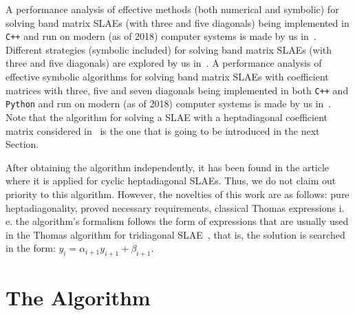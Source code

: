 \documentclass[11pt, a4paper]{article}
\begin{document}
A performance analysis of effective methods (both numerical and symbolic) for
solving band matrix SLAEs (with three and five diagonals) being implemented in
\texttt{C++} and run on modern (as of 2018) computer systems is made by us
in~\cite{Veneva_2019}. Different strategies (symbolic included) for solving
band matrix SLAEs (with three and five diagonals) are explored by us
in~\cite{Veneva_2018}. A performance analysis of effective symbolic algorithms
for solving band matrix SLAEs with coefficient matrices with three, five and
seven diagonals being implemented in both \texttt{C++} and \texttt{Python} and
run on modern (as of 2018) computer systems is made by us in~\cite{Veneva}.
Note that the algorithm for solving a SLAE with a heptadiagonal coefficient
matrix considered in~\cite{Veneva} is the one that is going to be introduced
in the next Section.

After obtaining the algorithm independently, it has been found in the
article~\cite{Karawia_2013b} where it is applied for cyclic heptadiagonal SLAEs.
Thus, we do not claim out priority to this algorithm. However, the
novelties of this work are as follows: pure heptadiagonality, proved necessary
requirements, classical Thomas expressions i.\,e. the algorithm's formalism
follows the form of expressions that are usually used in the Thomas
algorithm for tridiagonal SLAE~\cite{Higham}, that is, the solution is searched
in the form: $y_{i} = \alpha_{i+1}y_{i+1} + \beta_{i+1}$.


\section{The Algorithm}
\end{document}
